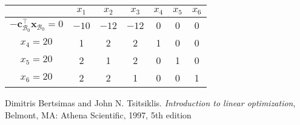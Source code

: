 \documentclass[12pt]{article}
\newcommand{\bx}{\mathbf{x}}
\begin{document}
\begin{enumerate}
\begin{table}[!ht]
\centering
\begin{tabular}{|c|cccccc|}
\hline
& $x_1$ & $x_2$ & $x_3$ & $x_4$ & $x_5$ & $x_6$\\
\hline
$-\mathbf{c}_{\mathcal{B}_0}^{\top}\bx_{\mathcal{B}_0} = 0$ & $-10$ & $-12$ & $-12$ & $0$ & $0$ & $0$ \\
\hline
$x_4 = 20$ & 1 & 2 & 2 & 1 & 0 & 0 \\
$x_5 = 20$ & 2 & 1 & 2 & 0 & 1 & 0 \\
$x_6 = 20$ & 2 & 2 & 1 & 0 & 0 & 1 \\
\hline
\end{tabular}
\end{table}
\end{enumerate}

\begin{thebibliography}{9}

Dimitris Bertsimas and John N. Tsitsiklis. \emph{Introduction to linear optimization}, Belmont, MA: Athena Scientific, 1997, 5th edition

\end{thebibliography}
\end{document}
